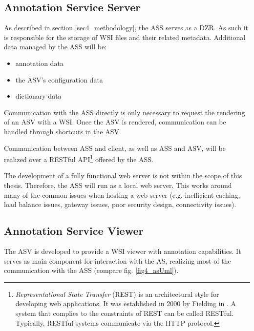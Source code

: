 \subsection{Annotation Service Server}
\label{sec4_assPart}
As described in section \ref{sec4_methodology}, the ASS serves as a DZR. As such it is responsible for the storage of WSI files and their related metadata\cite{Cornish13}. Additional data managed by the ASS will be:

\begin{itemize}
	\item annotation data
	\item the ASV's configuration data
	\item dictionary data
\end{itemize}

Communication with the ASS directly is only necessary to request the rendering of an ASV with a WSI. Once the ASV is rendered, communication can be handled through shortcuts in the ASV.\clearpage

Communication between ASS and client, as well as ASS and ASV, will be realized over a RESTful API\footnote{
	\emph{Representational State Transfer} (REST) is an architectural style for developing web applications. It was established in 2000 by Fielding in \cite{Fielding00}. A system that complies to the constraints of REST can be called RESTful. Typically, RESTful systems communicate via the HTTP protocol\cite{Fielding00}.
	} offered by the ASS.

The development of a fully functional web server is not within the scope of this thesis. Therefore, the ASS will run as a local web server. This works around many of the common issues when hosting a web server (e.g. inefficient caching, load balance issues, gateway issues, poor security design, connectivity issues)\cite{web:typicalissues}.


\subsection{Annotation Service Viewer}
\label{sec4_asvPart}

The ASV is developed to provide a WSI viewer with annotation capabilities. It serves as main component for interaction with the AS, realizing most of the communication with the ASS (compare fig. \ref{fig4_asUml}).


